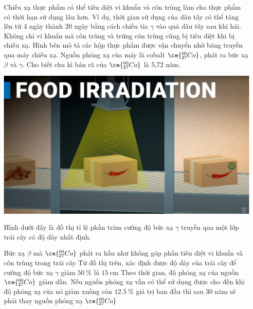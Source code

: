 \begin{ex}
	Chiếu xạ thực phẩm có thể tiêu diệt vi khuẩn và côn trùng làm cho thực phẩm có thời hạn sử dụng lâu hơn. Ví dụ, thời gian sử dụng của dâu tây có thể tăng lên từ 4 ngày thành 20 ngày bằng cách chiếu tia $\gamma$ vào quả dâu tây sau khi hái. Không chỉ vi khuẩn mà côn trùng và trứng côn trùng cũng bị tiêu diệt khi bị chiếu xạ. Hình bên mô tả các hộp thực phẩm được vận chuyển nhờ băng truyền qua máy chiếu xạ. Nguồn phóng xạ của máy là cobalt $\ce{^{60}_{27}Co}$, phát ra bức xạ $\beta$ và $\gamma$. Cho biết chu kì bán rã của $\ce{^{60}_{27}Co}$ là 5,72 năm.
	\begin{center}
		\includegraphics[width=0.35\linewidth]{../figs/VN12-Y24-PH-SYL-033P-1}
	\end{center}
	Hình dưới đây là đồ thị tỉ lệ phần trăm cường độ bức xạ $\gamma$ truyền qua một lớp trái cây có độ dày nhất định.
	\begin{center}
	\end{center}
	{\True Bức xạ $\beta$ mà $\ce{^{60}_{27}Co}$ phát ra hầu như không góp phần tiêu diệt vi khuẩn và côn trùng trong trái cây}
	{Từ đồ thị trên, xác định được độ dày của trái cây để cường độ bức xạ $\gamma$ giảm $\SI{50}{\percent}$ là $\SI{15}{\centi\meter}$}
	{Theo thời gian, độ phóng xạ của nguồn $\ce{^{60}_{27}Co}$ giảm dần.  Nếu nguồn phóng xạ vẫn có thể sử dụng được cho đến khi độ  phóng xạ của nó giảm xuống còn $\SI{12.5}{\percent}$ giá trị ban đầu thì sau 30 năm sẽ phải thay nguồn phóng xạ $\ce{^{60}_{27}Co}$}
	\loigiai{}
\end{ex}
